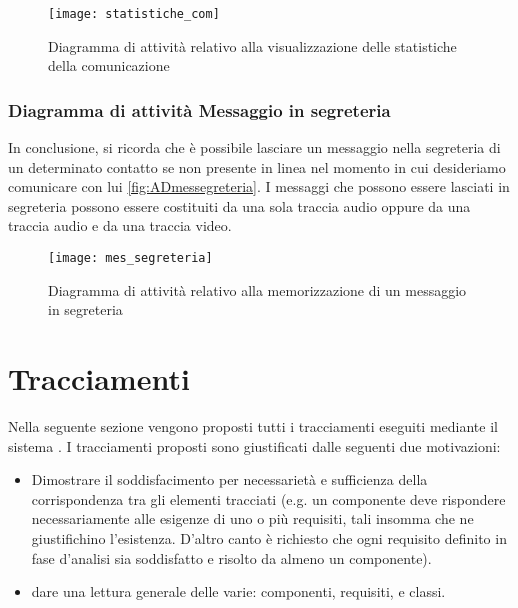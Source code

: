 \begin{figure}[H]
\centering
\texttt{[image: statistiche\_com]}
\caption{Diagramma di attività relativo alla visualizzazione delle statistiche della comunicazione}\label{fig:ADstatistiche}
\end{figure}

\subsubsection{Diagramma di attività Messaggio in segreteria}
In conclusione, si ricorda che è possibile lasciare un messaggio nella segreteria di un determinato contatto se non presente in linea nel momento in cui desideriamo comunicare con lui \vref{fig:ADmessegreteria}. I messaggi che possono essere lasciati in segreteria possono essere costituiti da una sola traccia audio oppure da una traccia audio e da una traccia video.

\begin{figure}[H]
\centering
\texttt{[image: mes\_segreteria]}
\caption{Diagramma di attività relativo alla memorizzazione di un messaggio in segreteria}\label{fig:ADmessegreteria}
\end{figure}
\clearpage

\section{Tracciamenti}\label{sec:tracciamenti}
Nella seguente sezione vengono proposti tutti i tracciamenti eseguiti mediante il sistema \manager. I tracciamenti proposti sono giustificati dalle seguenti due motivazioni:

\begin{itemize}
	\item Dimostrare il soddisfacimento per necessarietà e sufficienza della corrispondenza tra gli elementi tracciati (e.g. un componente deve rispondere necessariamente alle esigenze di uno o più requisiti, tali insomma che ne giustifichino l'esistenza. D'altro canto è richiesto che ogni requisito definito in fase d'analisi sia soddisfatto e risolto da almeno un componente).
	\item dare una lettura generale delle varie: componenti, requisiti,  e classi.
\end{itemize}




